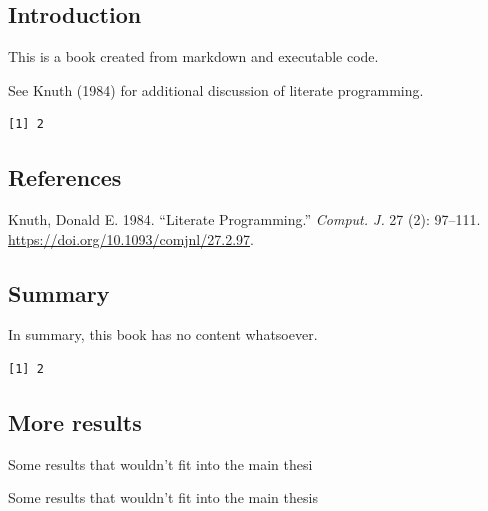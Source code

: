 \documentclass[
  a4paper,
]{scrbook}
\newlength{\cslhangindent}
\newlength{\cslentryspacingunit} %
\newenvironment{CSLReferences}[2] %
 {%
  \setlength{\parindent}{0pt}
  \ifodd #1
  \let\oldpar\par
  \def\par{\hangindent=\cslhangindent\oldpar}
  \fi
  \setlength{\parskip}{#2\cslentryspacingunit}
 }%
 {}
\begin{document}
\part{}

\hypertarget{introduction}{%
\chapter{Introduction}\label{introduction}}

This is a book created from markdown and executable code.

See Knuth (1984) for additional discussion of literate programming.

\begin{verbatim}
[1] 2
\end{verbatim}

\hypertarget{references}{%
\chapter*{References}\label{references}}

\hypertarget{refs}{}
\begin{CSLReferences}{1}{0}
\leavevmode{}%
Knuth, Donald E. 1984. {``Literate Programming.''} \emph{Comput. J.} 27
(2): 97--111. \url{https://doi.org/10.1093/comjnl/27.2.97}.

\end{CSLReferences}

\hypertarget{summary-1}{%
\chapter{Summary}\label{summary-1}}

In summary, this book has no content whatsoever.

\begin{verbatim}
[1] 2
\end{verbatim}

\appendix
{}

\hypertarget{sec-more-results}{%
\chapter{More results}\label{sec-more-results}}

Some results that wouldn't fit into the main thesi

Some results that wouldn't fit into the main thesis
\end{document}
